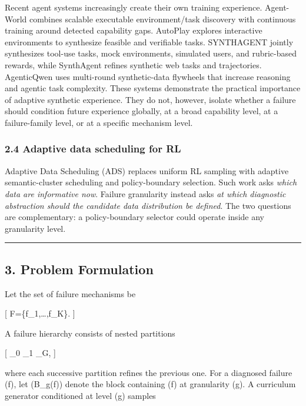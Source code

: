 \documentclass[
]{article}
\begin{document}
Recent agent systems increasingly create their own training experience.
Agent-World combines scalable executable environment/task discovery with
continuous training around detected capability gaps. AutoPlay explores
interactive environments to synthesize feasible and verifiable tasks.
SYNTHAGENT jointly synthesizes tool-use tasks, mock environments,
simulated users, and rubric-based rewards, while SynthAgent refines
synthetic web tasks and trajectories. AgenticQwen uses multi-round
synthetic-data flywheels that increase reasoning and agentic task
complexity. These systems demonstrate the practical importance of
adaptive synthetic experience. They do not, however, isolate whether a
failure should condition future experience globally, at a broad
capability level, at a failure-family level, or at a specific mechanism
level.

\subsubsection{2.4 Adaptive data scheduling for
RL}\label{adaptive-data-scheduling-for-rl}

Adaptive Data Scheduling (ADS) replaces uniform RL sampling with
adaptive semantic-cluster scheduling and policy-boundary selection. Such
work asks \emph{which data are informative now}. Failure granularity
instead asks \emph{at which diagnostic abstraction should the candidate
data distribution be defined}. The two questions are complementary: a
policy-boundary selector could operate inside any granularity level.

\begin{center}\rule{0.5\linewidth}{0.5pt}\end{center}

\subsection{3. Problem Formulation}\label{problem-formulation}

Let the set of failure mechanisms be

{[} \mathcal F=\{f\_1,\ldots,f\_K\}. {]}

A failure hierarchy consists of nested partitions

{[} \Pi\_0 \preceq \Pi\_1 \preceq \cdots \preceq \Pi\_G, {]}

where each successive partition refines the previous one. For a
diagnosed failure (f), let (B\_g(f)) denote the block containing (f) at
granularity (g). A curriculum generator conditioned at level (g) samples
\end{document}
